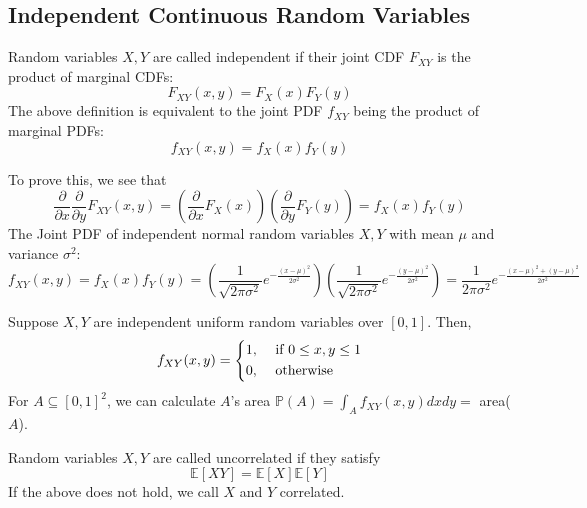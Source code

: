\subsection{Independent Continuous Random Variables}
\begin{definition}
    Random variables \(X, Y\) are called independent if their joint CDF \(F_{XY}\) is the product of marginal CDFs:
    \[
        F_{XY}(x, y) = F_X(x) F_Y(y) 
    \]
    The above definition is equivalent to the joint PDF \(f_{XY}\) being the product of marginal PDFs:
    \[
        f_{XY}(x, y) = f_X(x) f_Y(y) 
    \]
\end{definition}
To prove this, we see that 
\[
    \frac{\partial}{\partial x} \frac{\partial}{\partial y} F_{XY}(x, y) = (\frac{\partial }{\partial x} F_X(x))(\frac{\partial }{\partial y} F_Y(y)) = f_X(x) f_Y(y)
\]
The Joint PDF of independent normal random variables \(X, Y\) with mean \(\mu\) and variance \(\sigma^2\): 
\[
    f_{XY}(x, y) = f_X(x) f_Y(y) = \left(\dfrac{1}{\sqrt{2\pi \sigma^2}}e^{-\frac{(x - \mu)^2}{2\sigma^2}}\right)\left(\dfrac{1}{\sqrt{2\pi \sigma^2}}e^{-\frac{(y - \mu)^2}{2\sigma^2}}\right) = \dfrac{1}{2\pi \sigma^2}e^{-\frac{(x - \mu)^2 + (y - \mu)^2}{2\sigma^2}}
\] 

\newpage
\begin{eg}
    Suppose \(X, Y\) are independent uniform random variables over \([0, 1]\). Then,
    \[
        f_{XY}(x, y) = \begin{dcases}
            1 , &\text{ if } 0 \leq x, y \leq 1 \\
            0 , &\text{ otherwise }
        \end{dcases}
    \]
    For \(A \subseteq [0, 1]^2\), we can calculate \(A\)'s area \(\mathbb{P}(A) = \displaystyle\int_A f_{XY}(x, y)dx dy =\) area(\(A\)). 
\end{eg}

\begin{definition}
    Random variables \(X, Y\) are called uncorrelated if they satisfy 
    \[
        \mathbb{E}[XY] = \mathbb{E}[X]\mathbb{E}[Y]
    \]
    If the above does not hold, we call \(X\) and \(Y\) correlated.
\end{definition}

